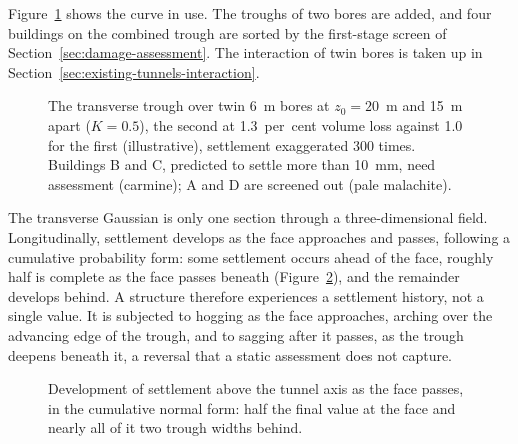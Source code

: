 Figure~\ref{fig:r3d-settlement-trough} shows the curve in use. The troughs of
two bores are added, and four buildings on the combined trough are sorted by
the first-stage screen of Section~\ref{sec:damage-assessment}. The interaction
of twin bores is taken up in Section~\ref{sec:existing-tunnels-interaction}.

\begin{figure}[htbp]
\centering
{}
\caption{The transverse trough over twin 6~m bores at $z_0 = 20$~m and 15~m apart ($K = 0.5$), the second at 1.3~per~cent volume loss against 1.0 for the first (illustrative), settlement exaggerated 300 times. Buildings B and C, predicted to settle more than 10~mm, need assessment (carmine); A and D are screened out (pale malachite).}
\label{fig:r3d-settlement-trough}
\end{figure}

The transverse Gaussian is only one section through a three-dimensional field.
Longitudinally, settlement develops as the face approaches and passes,
following a cumulative probability form: some settlement occurs ahead of the
face, roughly half is complete as the face passes beneath
(Figure~\ref{fig:settlement-development}), and the remainder
develops behind. A structure therefore experiences a settlement history, not a
single value. It is subjected to hogging as the face approaches, arching over
the advancing edge of the trough, and to sagging after it passes, as the
trough deepens beneath it, a reversal that a static assessment does not
capture.

\begin{figure}[htbp]
\centering
{}
\caption{Development of settlement above the tunnel axis as the face passes, in the cumulative normal form: half the final value at the face and nearly all of it two trough widths behind.}
\label{fig:settlement-development}
\end{figure}

